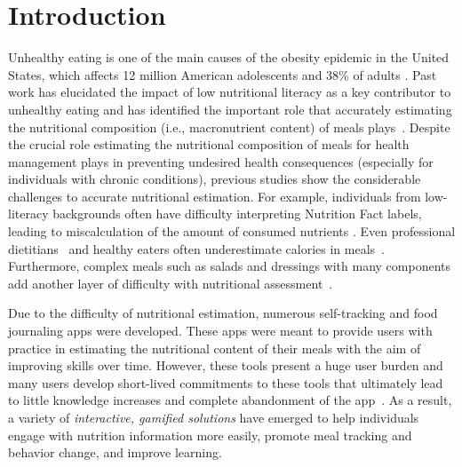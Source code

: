 \section{Introduction}
Unhealthy eating is one of the main causes of the obesity epidemic in the United States, which affects 12 million American adolescents and 38\% of adults \cite{trustforamericashealth,cdc2015,cdc2020}. Past work has elucidated the impact of low nutritional literacy as a key contributor to unhealthy eating and has identified the important role that accurately estimating the nutritional composition (i.e., macronutrient content) of meals plays~\cite{kindig2004health}. Despite the crucial role estimating the nutritional composition of meals for health management plays in preventing undesired health consequences (especially for individuals with chronic conditions), previous studies show the considerable challenges to accurate nutritional estimation. For example, individuals from low-literacy backgrounds often have difficulty interpreting Nutrition Fact labels, leading to miscalculation of the amount of consumed nutrients \cite{chaudry2013formative,huizinga2009literacy,rothman2006patient}. Even professional dietitians~\cite{chandon2007obesity} and healthy eaters often underestimate calories in meals~\cite{chandon2007biasing}. Furthermore, complex meals such as salads and dressings with many components add another layer of difficulty with nutritional assessment~\cite{noronha2011platemate}.


Due to the difficulty of nutritional estimation, numerous self-tracking and food journaling apps were developed. These apps were meant to provide users with practice in estimating the nutritional content of their meals with the aim of improving skills over time. However, these tools present a huge user burden and many users develop short-lived commitments to these tools that ultimately lead to little knowledge increases and complete abandonment of the app~\cite{choe2014understanding,Cordeiro:2015:RMF:2702123.2702154,cordeiro2015barriers,epstein2016crumbs,mattila2008mobile}. As a result, a variety of \textit{interactive, gamified solutions} have emerged to help individuals engage with nutrition information more easily, promote meal tracking and behavior change, and improve learning. 


